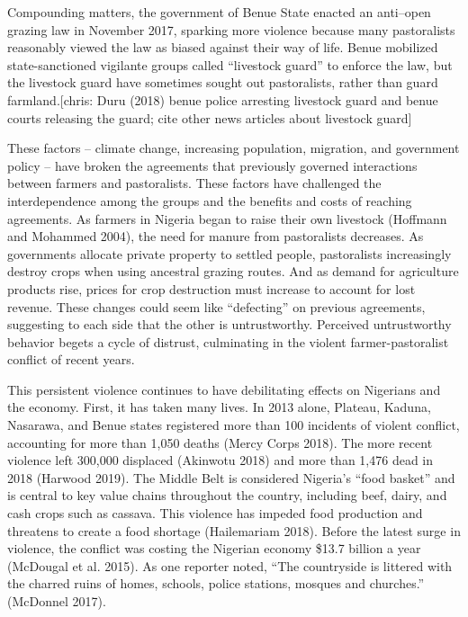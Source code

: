 \documentclass[11pt]{article}
\begin{document}
Compounding matters, the government of Benue State enacted an anti--open
grazing law in November 2017, sparking more violence because many
pastoralists reasonably viewed the law as biased against their way of
life. Benue mobilized state-sanctioned vigilante groups called
``livestock guard'' to enforce the law, but the livestock guard have
sometimes sought out pastoralists, rather than guard farmland.{[}chris:
Duru (2018) benue police arresting livestock guard and benue courts
releasing the guard; cite other news articles about livestock guard{]}

These factors -- climate change, increasing population, migration, and
government policy -- have broken the agreements that previously governed
interactions between farmers and pastoralists. These factors have
challenged the interdependence among the groups and the benefits and
costs of reaching agreements. As farmers in Nigeria began to raise their
own livestock (Hoffmann and Mohammed 2004), the need for manure from
pastoralists decreases. As governments allocate private property to
settled people, pastoralists increasingly destroy crops when using
ancestral grazing routes. And as demand for agriculture products rise,
prices for crop destruction must increase to account for lost revenue.
These changes could seem like ``defecting'' on previous agreements,
suggesting to each side that the other is untrustworthy. Perceived
untrustworthy behavior begets a cycle of distrust, culminating in the
violent farmer-pastoralist conflict of recent years.

This persistent violence continues to have debilitating effects on
Nigerians and the economy. First, it has taken many lives. In 2013
alone, Plateau, Kaduna, Nasarawa, and Benue states registered more than
100 incidents of violent conflict, accounting for more than 1,050 deaths
(Mercy Corps 2018). The more recent violence left 300,000 displaced
(Akinwotu 2018) and more than 1,476 dead in 2018 (Harwood 2019). The
Middle Belt is considered Nigeria's ``food basket'' and is central to
key value chains throughout the country, including beef, dairy, and cash
crops such as cassava. This violence has impeded food production and
threatens to create a food shortage (Hailemariam 2018). Before the
latest surge in violence, the conflict was costing the Nigerian economy
\$13.7 billion a year (McDougal et al. 2015). As one reporter noted,
``The countryside is littered with the charred ruins of homes, schools,
police stations, mosques and churches.'' (McDonnel 2017).
\end{document}
